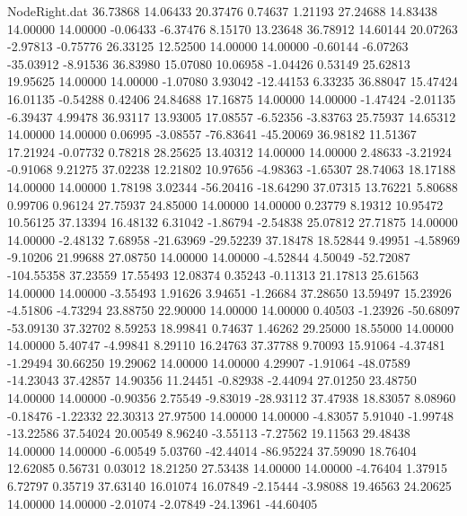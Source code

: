\begin{filecontents}{NodeRight.dat}
  36.73868   14.06433   20.37476     0.74637    1.21193   27.24688   14.83438   14.00000   14.00000   -0.06433   -6.37476    8.15170   13.23648
  36.78912   14.60144   20.07263    -2.97813   -0.75776   26.33125   12.52500   14.00000   14.00000   -0.60144   -6.07263  -35.03912   -8.91536
  36.83980   15.07080   10.06958    -1.04426    0.53149   25.62813   19.95625   14.00000   14.00000   -1.07080    3.93042  -12.44153    6.33235
  36.88047   15.47424   16.01135    -0.54288    0.42406   24.84688   17.16875   14.00000   14.00000   -1.47424   -2.01135   -6.39437    4.99478
  36.93117   13.93005   17.08557    -6.52356   -3.83763   25.75937   14.65312   14.00000   14.00000    0.06995   -3.08557  -76.83641  -45.20069
  36.98182   11.51367   17.21924    -0.07732    0.78218   28.25625   13.40312   14.00000   14.00000    2.48633   -3.21924   -0.91068    9.21275
  37.02238   12.21802   10.97656    -4.98363   -1.65307   28.74063   18.17188   14.00000   14.00000    1.78198    3.02344  -56.20416  -18.64290
  37.07315   13.76221    5.80688     0.99706    0.96124   27.75937   24.85000   14.00000   14.00000    0.23779    8.19312   10.95472   10.56125
  37.13394   16.48132    6.31042    -1.86794   -2.54838   25.07812   27.71875   14.00000   14.00000   -2.48132    7.68958  -21.63969  -29.52239
  37.18478   18.52844    9.49951    -4.58969   -9.10206   21.99688   27.08750   14.00000   14.00000   -4.52844    4.50049  -52.72087 -104.55358
  37.23559   17.55493   12.08374     0.35243   -0.11313   21.17813   25.61563   14.00000   14.00000   -3.55493    1.91626    3.94651   -1.26684
  37.28650   13.59497   15.23926    -4.51806   -4.73294   23.88750   22.90000   14.00000   14.00000    0.40503   -1.23926  -50.68097  -53.09130
  37.32702    8.59253   18.99841     0.74637    1.46262   29.25000   18.55000   14.00000   14.00000    5.40747   -4.99841    8.29110   16.24763
  37.37788    9.70093   15.91064    -4.37481   -1.29494   30.66250   19.29062   14.00000   14.00000    4.29907   -1.91064  -48.07589  -14.23043
  37.42857   14.90356   11.24451    -0.82938   -2.44094   27.01250   23.48750   14.00000   14.00000   -0.90356    2.75549   -9.83019  -28.93112
  37.47938   18.83057    8.08960    -0.18476   -1.22332   22.30313   27.97500   14.00000   14.00000   -4.83057    5.91040   -1.99748  -13.22586
  37.54024   20.00549    8.96240    -3.55113   -7.27562   19.11563   29.48438   14.00000   14.00000   -6.00549    5.03760  -42.44014  -86.95224
  37.59090   18.76404   12.62085     0.56731    0.03012   18.21250   27.53438   14.00000   14.00000   -4.76404    1.37915    6.72797    0.35719
  37.63140   16.01074   16.07849    -2.15444   -3.98088   19.46563   24.20625   14.00000   14.00000   -2.01074   -2.07849  -24.13961  -44.60405

\end{filecontents}
